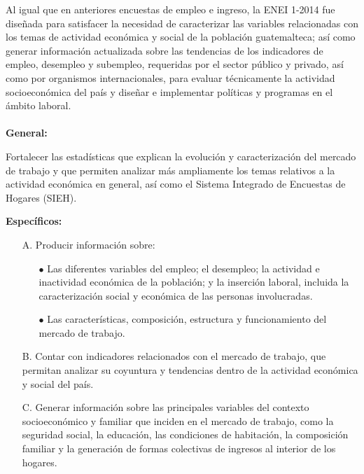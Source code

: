 \documentclass[12pt,letterpaper,twoside]{book}
\let\origdoublepage\cleardoublepage
\newcommand{\clearemptydoublepage}{
  		\clearpage
  		{\pagestyle{empty}\origdoublepage}}
\let\cleardoublepage\clearemptydoublepage
\begin{document}
Al igual que en anteriores encuestas de empleo e ingreso, la ENEI 1-2014 fue diseñada para satisfacer la necesidad de caracterizar las variables relacionadas con los temas de actividad económica y social de la población guatemalteca; así como generar información actualizada sobre las tendencias de los indicadores de empleo, desempleo y subempleo, requeridas por el sector público y privado, así como por organismos internacionales, para evaluar técnicamente la actividad socioeconómica del país y diseñar e implementar políticas y programas en el ámbito laboral.\\[6mm]


\\[1mm] 


\noindent\textbf{General:}

Fortalecer las estadísticas que explican la evolución y caracterización del mercado de trabajo y que permiten analizar más ampliamente los temas relativos a la actividad económica en general, así como el Sistema Integrado de Encuestas de Hogares (SIEH).


\noindent\textbf{Específicos:}\\[-0.5cm]


\begin{itemize}
\item[A.] Producir información sobre:

\begin{itemize}
\item[$\bullet$] Las diferentes variables del empleo; el desempleo; la actividad e inactividad económica de la población; y la inserción laboral, incluida la caracterización social y económica de las personas involucradas.
\item[$\bullet$] Las características, composición, estructura y funcionamiento del mercado de trabajo.
\end{itemize}

\item[B.]	Contar con indicadores relacionados con el mercado de trabajo, que permitan analizar su coyuntura y tendencias dentro de la actividad económica y social del país.

\item[C.]	Generar información sobre las principales variables del contexto socioeconómico y familiar que inciden en el mercado de trabajo, como la seguridad social, la educación, las condiciones de habitación, la composición familiar y la generación de formas colectivas de ingresos al interior de los hogares.
\end{itemize}\thispagestyle{empty}\setcounter{page}{0}
\cleardoublepage
\end{document}
